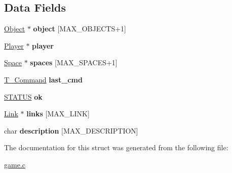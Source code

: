 \subsection*{Data Fields}
\begin{DoxyCompactItemize}
\item 
\mbox{\label{struct__Game_acf0d86e2331b09230ba20bc31624b917}} 
\hyperlink{struct__Object}{Object} $\ast$ {\bfseries object} \mbox{[}M\+A\+X\+\_\+\+O\+B\+J\+E\+C\+TS+1\mbox{]}
\item 
\mbox{\label{struct__Game_a31406605782d71ec00c4bf258ea76267}} 
\hyperlink{player_8h_af30e2030635a69690f85e48bc6ef202f}{Player} $\ast$ {\bfseries player}
\item 
\mbox{\label{struct__Game_ab4180417d9148f8abb2233ca6c4ecfe5}} 
\hyperlink{space_8h_a67533ffc2b70463baecc38fb0629bbfc}{Space} $\ast$ {\bfseries spaces} \mbox{[}M\+A\+X\+\_\+\+S\+P\+A\+C\+ES+1\mbox{]}
\item 
\mbox{\label{struct__Game_a27727b50ea0904a1fe9e1c55c27f2cf1}} 
\hyperlink{command_8h_a0473597db8c45c0289b6b8e2f8abbe32}{T\+\_\+\+Command} {\bfseries last\+\_\+cmd}
\item 
\mbox{\label{struct__Game_a86ed212e01092ade837b91310db676b3}} 
\hyperlink{types_8h_a32c27cc471df37f4fc818d65de0a56c4}{S\+T\+A\+T\+US} {\bfseries ok}
\item 
\mbox{\label{struct__Game_aa4ff88aaf2a54616e5863609effad94e}} 
\hyperlink{link_8h_ae3b299941e67be6971bfd64a25505eff}{Link} $\ast$ {\bfseries links} \mbox{[}M\+A\+X\+\_\+\+L\+I\+NK\mbox{]}
\item 
\mbox{\label{struct__Game_a69d6a2fcfcab39d34ebb295a980bc1a9}} 
char {\bfseries description} \mbox{[}M\+A\+X\+\_\+\+D\+E\+S\+C\+R\+I\+P\+T\+I\+ON\mbox{]}
\end{DoxyCompactItemize}


The documentation for this struct was generated from the following file\+:\begin{DoxyCompactItemize}
\item 
\hyperlink{game_8c}{game.\+c}\end{DoxyCompactItemize}
